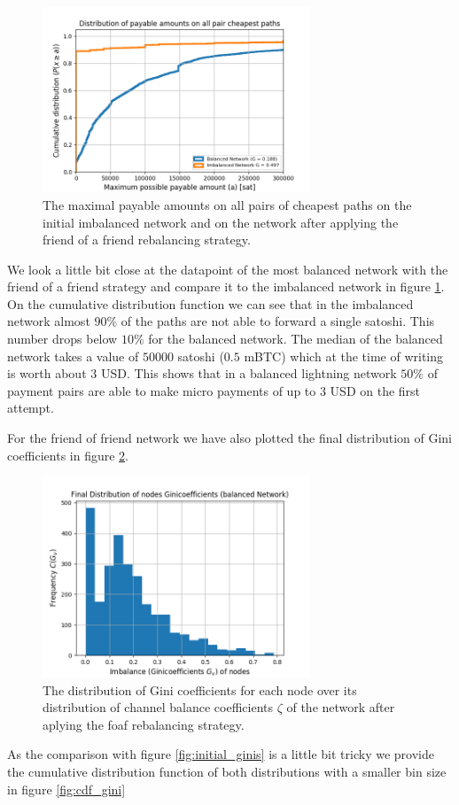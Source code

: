 \documentclass[a4paper]{paper}
\begin{document}
\begin{figure}
 \centering
 \includegraphics[width=8cm]{code/vs/fig/maximum_payable_amount_all_pair_chepest_paths_balanced_network.png}
 \caption{The maximal payable amounts on all pairs of cheapest paths on the initial imbalanced network and on the network after applying the friend of a friend rebalancing strategy.}
 \label{fig:cdf_paymentsize}
\end{figure}
We look a little bit close at the datapoint of the most balanced network with the friend of a friend strategy and compare it to the imbalanced network in figure \cref{fig:cdf_paymentsize}.
On the cumulative distribution function we can see that in the imbalanced network almost $90\%$ of the paths are not able to forward a single satoshi.
This number drops below $10\%$ for the balanced network.
The median of the balanced network takes a value of $50000$ satoshi ($0.5$ mBTC) which at the time of writing is worth about $3$ USD.
This shows that in a balanced lightning network $50\%$ of payment pairs are able to make micro payments of up to $3$ USD on the first attempt. 


For the friend of friend network we have also plotted the final distribution of Gini coefficients in figure \cref{fig:final_gini}. 
\begin{figure}
 \centering
 \includegraphics[width=8cm]{code/vs/fig/Final_ginis_after_rebalancing.png}
 \caption{The distribution of Gini coefficients for each node over its distribution of channel balance coefficients $\zeta$ of the network after aplying the foaf rebalancing strategy.}
 \label{fig:final_gini}
\end{figure}
As the comparison with figure \cref{fig:initial_ginis} is a little bit tricky we provide the cumulative distribution function of both distributions with a smaller bin size in figure \cref{fig:cdf_gini}
\end{document}
